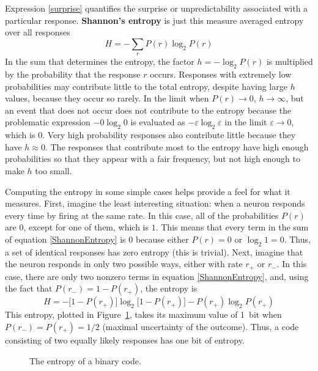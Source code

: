 Expression \eqref{surprise} quantifies the surprise or unpredictability associated with a particular response. \textbf{Shannon's entropy} is just this measure averaged entropy over all responses
\begin{equation}\label{ShannonEntropy}
\boxed{H=-\sum_rP(r)\log_{2}P(r)}
\end{equation}
In the sum that determines the entropy, the factor $h=-\log_{2}P(r)$ is multiplied by the probability that the response $r$ occurs. Responses with extremely low probabilities may contribute little to the total entropy, despite having large $h$ values, because they occur so rarely. In the limit when $P(r)\rightarrow0$, $h\rightarrow\infty$, but an event that does not occur does not contribute to the entropy because the problematic expression $-0\log_{2}0$ is evaluated as $-\varepsilon\log_{2}\varepsilon$ in the limit $\varepsilon\rightarrow0$, which is $0$. Very high probability responses also contribute little because they have $h\approx0$. The responses that contribute most to the entropy have high enough probabilities so that they appear with a fair frequency, but not high enough to make $h$ too small.

Computing the entropy in some simple cases helps provide a feel for what it measures. First, imagine the least interesting situation: when a neuron responds every time by firing at the same rate. In this case, all of the probabilities $P(r)$ are $0$, except for one of them, which is $1$. This means that every term in the sum of equation \eqref{ShannonEntropy} is $0$ because either $P(r)=0$ or $\log_{2}1=0$. Thus, a set of identical responses has zero entropy (this is trivial). Next, imagine that the neuron responds in only two possible ways, either with rate $r_+$ or $r_-$. In this case, there are only two nonzero terms in equation \eqref{ShannonEntropy}, and, using the fact that $P(r_-)=1-P(r_+)$, the entropy is
\begin{equation}\label{H=1bit}
H=-\bigl[1-P(r_+)\bigr]\log_{2}{\bigl[1-P(r_+)\bigr]}-P(r_+)\log_{2}{P(r_+)}
\end{equation}
This entropy, plotted in Figure~\ref{ShannonEntropyBinaryCode}, takes its maximum value of \SI{1}{bit} when $P(r_-)=P(r_+)=1/2$ (maximal uncertainty of the outcome). Thus, a code consisting of two equally likely responses has one bit of entropy.
\begin{figure}[h!t]
\centering
\pgfplotsset{set layers}
\caption{The entropy of a binary code.}\label{ShannonEntropyBinaryCode}
\end{figure}
